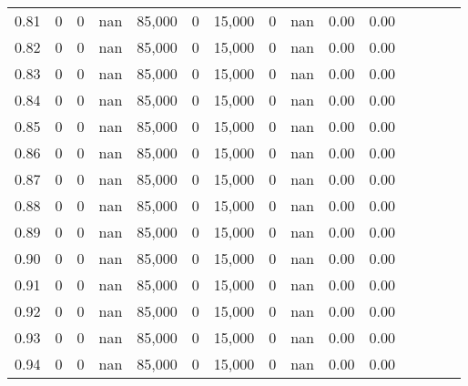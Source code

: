 \begin{tabular}{rrrcrrrrrrrrrrr}
0.81 &      0 &    0 &                                        nan &  85,000 &       0 &  15,000 &       0 &   nan &  0.00 &                         0.00 \\
0.82 &      0 &    0 &                                        nan &  85,000 &       0 &  15,000 &       0 &   nan &  0.00 &                         0.00 \\
0.83 &      0 &    0 &                                        nan &  85,000 &       0 &  15,000 &       0 &   nan &  0.00 &                         0.00 \\
0.84 &      0 &    0 &                                        nan &  85,000 &       0 &  15,000 &       0 &   nan &  0.00 &                         0.00 \\
0.85 &      0 &    0 &                                        nan &  85,000 &       0 &  15,000 &       0 &   nan &  0.00 &                         0.00 \\
0.86 &      0 &    0 &                                        nan &  85,000 &       0 &  15,000 &       0 &   nan &  0.00 &                         0.00 \\
0.87 &      0 &    0 &                                        nan &  85,000 &       0 &  15,000 &       0 &   nan &  0.00 &                         0.00 \\
0.88 &      0 &    0 &                                        nan &  85,000 &       0 &  15,000 &       0 &   nan &  0.00 &                         0.00 \\
0.89 &      0 &    0 &                                        nan &  85,000 &       0 &  15,000 &       0 &   nan &  0.00 &                         0.00 \\
0.90 &      0 &    0 &                                        nan &  85,000 &       0 &  15,000 &       0 &   nan &  0.00 &                         0.00 \\
0.91 &      0 &    0 &                                        nan &  85,000 &       0 &  15,000 &       0 &   nan &  0.00 &                         0.00 \\
0.92 &      0 &    0 &                                        nan &  85,000 &       0 &  15,000 &       0 &   nan &  0.00 &                         0.00 \\
0.93 &      0 &    0 &                                        nan &  85,000 &       0 &  15,000 &       0 &   nan &  0.00 &                         0.00 \\
0.94 &      0 &    0 &                                        nan &  85,000 &       0 &  15,000 &       0 &   nan &  0.00 &                         0.00 \\

\end{tabular}
